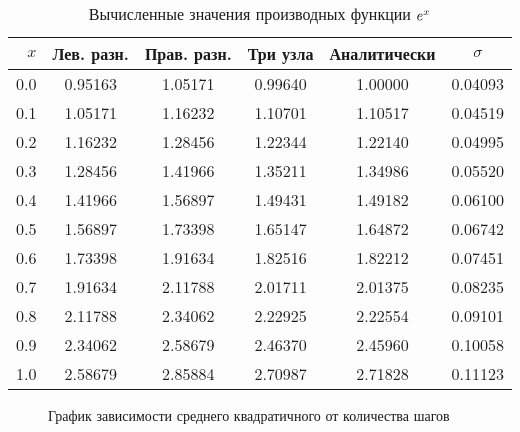 \documentclass{article}
\begin{document}
\begin{table}[htp]
    \centering
    \caption{Вычисленные значения производных функции $e^x$}
    \label{tab:Fii}
    \begin{tabular}{r|c|c|c|c|c}
        $x$ & Лев. разн. & Прав. разн. & Три узла & Аналитически & $\sigma$ \\
        \hline
        0.0 & 0.95163 & 1.05171 & 0.99640 & 1.00000 & 0.04093 \\
        0.1 & 1.05171 & 1.16232 & 1.10701 & 1.10517 & 0.04519 \\
        0.2 & 1.16232 & 1.28456 & 1.22344 & 1.22140 & 0.04995 \\
        0.3 & 1.28456 & 1.41966 & 1.35211 & 1.34986 & 0.05520 \\
        0.4 & 1.41966 & 1.56897 & 1.49431 & 1.49182 & 0.06100 \\
        0.5 & 1.56897 & 1.73398 & 1.65147 & 1.64872 & 0.06742 \\
        0.6 & 1.73398 & 1.91634 & 1.82516 & 1.82212 & 0.07451 \\
        0.7 & 1.91634 & 2.11788 & 2.01711 & 2.01375 & 0.08235 \\
        0.8 & 2.11788 & 2.34062 & 2.22925 & 2.22554 & 0.09101 \\
        0.9 & 2.34062 & 2.58679 & 2.46370 & 2.45960 & 0.10058 \\
        1.0 & 2.58679 & 2.85884 & 2.70987 & 2.71828 & 0.11123 \\
        \hline
    \end{tabular}
\end{table}

\begin{figure}[htpb]
    \begin{center}
    \end{center}
    \caption{График зависимости среднего квадратичного от количества шагов}%
    \label{fig:dev}
\end{figure}
\end{document}
